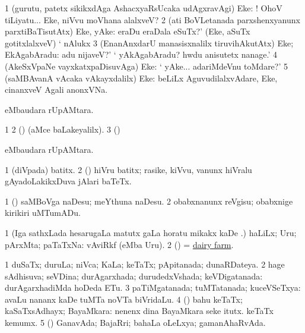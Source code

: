 \bentry
{} 
\gl{\BAavayx}
\bmng
\bnum
\num{1} (gurutu, patetx sikikxdAga AshacxyaRsUcaka udAgxravAgi) Eke: ! OhoV tiLiyatu... Eke, niVvu moVhana alalxveV? 
\num{2} (ati BoVLetanada parxshenxyanunx parxtiBaTisutAtx) Eke, yAke:  eraDu eraDala eSuTx?' (Eke, aSuTx gotitxlalxveV) ` nAlukx 
\num{3} (EnanAnxdarU manasisxnalilx tiruvihAkutAtx) Eke; EkAgabAradu:  adu nijaveV?' ` yAkAgabAradu? hwdu anisutetx nanage.' 
\num{4} (AkeSxVpaNe vayxkatxpaDisuvAga) Eke:  ` yAke... adariMdeVnu toMdare?' 
\num{5} (saMBAvanA vAcaka vAkayxdalilx) Eke:  beLiLx AguvudilalxvAdare, Eke, cinanxveV Agali anonxVNa. 
\enum
\emng
\eentry

\bentry
{}
\gl{\nA}
\bmng
{} eMbaudara rUpAMtara. 
\emng
\eentry

\bentry
{}
\gl{\saMkiSx}
\bmng
\bnum
\num{1}  
\num{2} (\ame)  (aMce baLakeyalilx). 
\num{3} (\birx)  
\enum
\emng
\eentry

\bentry
{}
\gl{\sapUpa}
\bmng
{} eMbaudara rUpAMtara. 
\emng
\eentry

\bentry
{} 
\gl{\nA}
\expl{}
\bmng
\bnum
\num{1} (diVpada) batitx. 
\num{2} (\shaveY) hiVru batitx; rasike, kiVvu, \mo vanunx hiVralu gAyadoLakikxDuva jAlari baTeTx. 
\enum
\emng

\noindent 
\gl{\pagu}
\bmng
\bnum
\num{1}  (\ashi) saMBoVga naDesu; meYthuna naDesu. 
\num{2}  obabxnanunx reVgisu; obabxnige kirikiri uMTumADu. 
\enum
\emng
\eentry

\bentry
{} 
\gl{\nA}
\bmng
\bnum
\num{1} (Iga sathxLada hesarugaLa matutx \saMpa gaLa horatu mikakx kaDe \pArxM.) haLiLx; Uru; pArxMta; paTaTxNa:  vAviRkf (eMba Uru). 
\num{2} (\pArxM) = \hyperref{kandict_d.pdf}{D}{dairy farm}{dairy farm}. 
\enum
\emng
\eentry

\bentry
{}
\gl{\gu} 
\bmng
\bnum
\num{1} duSaTx; duruLa; niVca; KaLa; keTaTx; pApitanada; dunaRDateya. 
\num{2} hage sAdhisuva; seVDina; durAgarxhada; durudedxVshada; keVDigatanada:  durAgarxhadiMda hoDeda ETu. 
\num{3} paTiMgatanada; tuMTatanada; kuceVSeTxya:  avaLu nananx kaDe tuMTa noVTa biVridaLu. 
\num{4} (\AmA) bahu keTaTx; kaSaTxsAdhayx; BayaMkara:  nenenx dina BayaMkara seke itutx.  keTaTx kemumx. 
\num{5} (\ashi) GanavAda; BajaRri; bahaLa oLeLxya; gamanAhaRvAda. 
\enum
\emng

